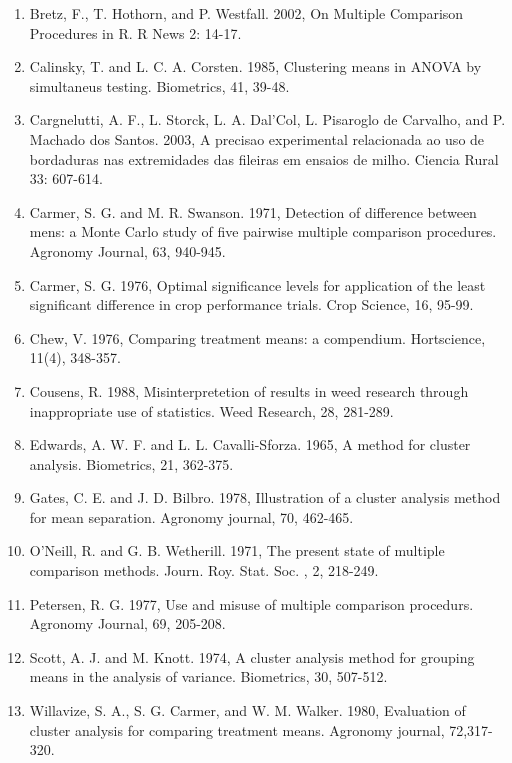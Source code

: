 \documentclass[a4paper,12pt,oneside]{book}
\providecommand{\tightlist}{%
  \setlength{\itemsep}{0pt}\setlength{\parskip}{0pt}}
\theoremstyle{definition}
\theoremstyle{definition}
\theoremstyle{definition}
\theoremstyle{remark}
\begin{document}
\begin{enumerate}
\def\labelenumi{\arabic{enumi}.}
\tightlist
\item
  Bretz, F., T. Hothorn, and P. Westfall. 2002, On Multiple Comparison
  Procedures in R. R News 2: 14-17.
\item
  Calinsky, T. and L. C. A. Corsten. 1985, Clustering means in ANOVA by
  simultaneus testing. Biometrics, 41, 39-48.
\item
  Cargnelutti, A. F., L. Storck, L. A. Dal'Col, L. Pisaroglo de
  Carvalho, and P. Machado dos Santos. 2003, A precisao experimental
  relacionada ao uso de bordaduras nas extremidades das fileiras em
  ensaios de milho. Ciencia Rural 33: 607-614.
\item
  Carmer, S. G. and M. R. Swanson. 1971, Detection of difference between
  mens: a Monte Carlo study of five pairwise multiple comparison
  procedures. Agronomy Journal, 63, 940-945.
\item
  Carmer, S. G. 1976, Optimal significance levels for application of the
  least significant difference in crop performance trials. Crop Science,
  16, 95-99.
\item
  Chew, V. 1976, Comparing treatment means: a compendium. Hortscience,
  11(4), 348-357.
\item
  Cousens, R. 1988, Misinterpretetion of results in weed research
  through inappropriate use of statistics. Weed Research, 28, 281-289.
\item
  Edwards, A. W. F. and L. L. Cavalli-Sforza. 1965, A method for cluster
  analysis. Biometrics, 21, 362-375.
\item
  Gates, C. E. and J. D. Bilbro. 1978, Illustration of a cluster
  analysis method for mean separation. Agronomy journal, 70, 462-465.
\item
  O'Neill, R. and G. B. Wetherill. 1971, The present state of multiple
  comparison methods. Journ. Roy. Stat. Soc. , 2, 218-249.
\item
  Petersen, R. G. 1977, Use and misuse of multiple comparison procedurs.
  Agronomy Journal, 69, 205-208.
\item
  Scott, A. J. and M. Knott. 1974, A cluster analysis method for
  grouping means in the analysis of variance. Biometrics, 30, 507-512.
\item
  Willavize, S. A., S. G. Carmer, and W. M. Walker. 1980, Evaluation of
  cluster analysis for comparing treatment means. Agronomy journal,
  72,317-320.
\end{enumerate}
\end{document}
